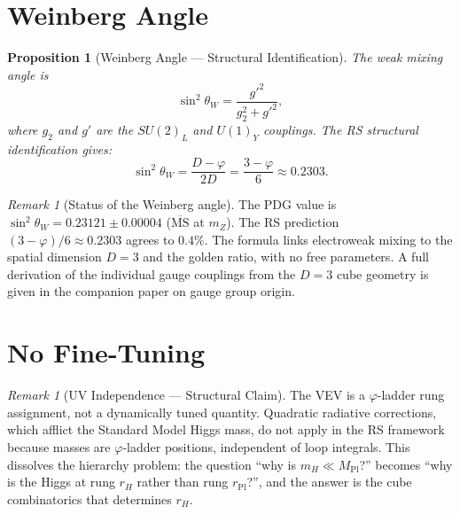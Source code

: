 \documentclass[12pt,a4paper]{article}
\newtheorem{proposition}[theorem]{Proposition}
\theoremstyle{definition}
\theoremstyle{remark}
\newtheorem{remark}[theorem]{Remark}
\begin{document}
\section{Weinberg Angle}
\label{sec:weinberg}

\begin{proposition}[Weinberg Angle --- Structural Identification]
The weak mixing angle is
\begin{equation}
  \sin^2\theta_W = \frac{g'^2}{g_2^2 + g'^2},
\end{equation}
where $g_2$ and $g'$ are the $SU(2)_L$ and $U(1)_Y$ couplings.
The RS structural identification gives:
\begin{equation}
  \boxed{\sin^2\theta_W = \frac{D - \varphi}{2D}
  = \frac{3 - \varphi}{6} \approx 0.2303.}
\end{equation}
\end{proposition}

\begin{remark}[Status of the Weinberg angle]
The PDG value is $\sin^2\theta_W = 0.23121 \pm 0.00004$
($\overline{\mathrm{MS}}$ at $m_Z$).  The RS prediction
$(3 - \varphi)/6 \approx 0.2303$ agrees to $0.4\%$.  The
formula links electroweak mixing to the spatial dimension
$D = 3$ and the golden ratio, with no free parameters.
A full derivation of the individual gauge couplings from
the $D = 3$ cube geometry is given in the companion paper
on gauge group origin.
\end{remark}

\section{No Fine-Tuning}
\label{sec:no-tuning}

\begin{remark}[UV Independence --- Structural Claim]
The VEV is a $\varphi$-ladder rung assignment, not a dynamically tuned
quantity.  Quadratic radiative corrections, which afflict the
Standard Model Higgs mass, do not apply in the RS framework because
masses are $\varphi$-ladder positions, independent of loop integrals.
This dissolves the hierarchy problem: the question ``why is
$m_H \ll M_{\mathrm{Pl}}$?'' becomes ``why is the Higgs at rung $r_H$
rather than rung $r_{\mathrm{Pl}}$?'', and the answer is the cube
combinatorics that determines $r_H$.
\end{remark}
\end{document}
